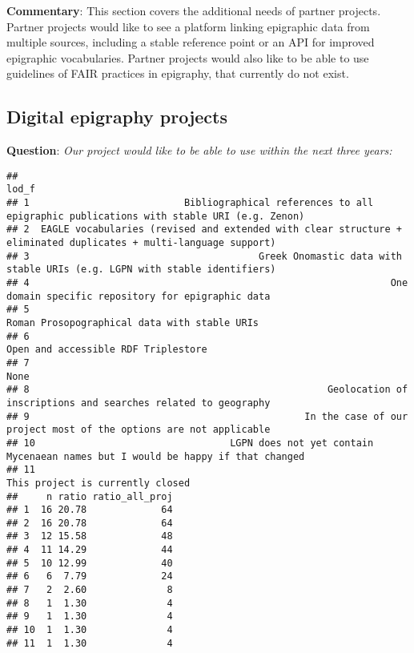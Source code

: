 \documentclass[
]{article}
\begin{document}
\textbf{Commentary}: This section covers the additional needs of partner
projects. Partner projects would like to see a platform linking
epigraphic data from multiple sources, including a stable reference
point or an API for improved epigraphic vocabularies. Partner projects
would also like to be able to use guidelines of FAIR practices in
epigraphy, that currently do not exist.

\hypertarget{digital-epigraphy-projects-1}{%
\subsection{Digital epigraphy
projects}\label{digital-epigraphy-projects-1}}

\textbf{Question}: \emph{Our project would like to be able to use within
the next three years:}

\begin{verbatim}
##                                                                                                              lod_f
## 1                           Bibliographical references to all epigraphic publications with stable URI (e.g. Zenon)
## 2  EAGLE vocabularies (revised and extended with clear structure + eliminated duplicates + multi-language support)
## 3                                        Greek Onomastic data with stable URIs (e.g. LGPN with stable identifiers)
## 4                                                               One domain specific repository for epigraphic data
## 5                                                                     Roman Prosopographical data with stable URIs
## 6                                                                              Open and accessible RDF Triplestore
## 7                                                                                                             None
## 8                                                    Geolocation of inscriptions and searches related to geography
## 9                                                In the case of our project most of the options are not applicable
## 10                                  LGPN does not yet contain Mycenaean names but I would be happy if that changed
## 11                                                                                This project is currently closed
##     n ratio ratio_all_proj
## 1  16 20.78             64
## 2  16 20.78             64
## 3  12 15.58             48
## 4  11 14.29             44
## 5  10 12.99             40
## 6   6  7.79             24
## 7   2  2.60              8
## 8   1  1.30              4
## 9   1  1.30              4
## 10  1  1.30              4
## 11  1  1.30              4
\end{verbatim}
\end{document}
